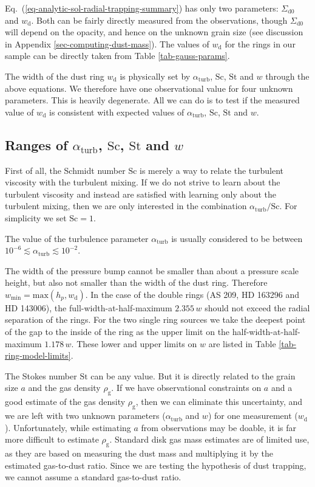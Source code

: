 \documentclass{aa}
\begin{document}
Eq.~(\ref{eq-analytic-sol-radial-trapping-summary}) has only two parameters:
$\Sigma_{\mathrm{d0}}$ and $w_{\mathrm{d}}$. Both can be fairly directly
measured from the observations, though $\Sigma_{\mathrm{d0}}$ will depend on the
opacity, and hence on the unknown grain size (see discussion in Appendix
\ref{sec-computing-dust-mass}). The values of $w_{\mathrm{d}}$ for
the rings in our sample can be directly taken from Table \ref{tab-gauss-params}.

The width of the dust ring $w_{\mathrm{d}}$ is physically set by
$\alpha_{\mathrm{turb}}$, $\mathrm{Sc}$, $\mathrm{St}$ and $w$ through the above
equations. We therefore
have one observational value for four unknown parameters. This is heavily
degenerate. All we can do is to test if the measured value of
$w_{\mathrm{d}}$ is consistent with expected values of $\alpha_{\mathrm{turb}}$,
$\mathrm{Sc}$, $\mathrm{St}$ and $w$.

\subsection{Ranges of $\alpha_{\mathrm{turb}}$, $\mathrm{Sc}$, $\mathrm{St}$ and $w$}
\label{sec-ranges-of-params}
%
First of all, the Schmidt number $\mathrm{Sc}$ is merely a way to relate the
turbulent viscosity with the turbulent mixing. If we do not strive to learn
about the turbulent viscosity and instead are satisfied with learning only about
the turbulent mixing, then we are only interested in the combination
$\alpha_{\mathrm{turb}}/\mathrm{Sc}$. For simplicity we set $\mathrm{Sc}=1$.

The value of the turbulence parameter $\alpha_{\mathrm{turb}}$ is usually
considered to be between $10^{-6}\lesssim \alpha_{\mathrm{turb}}\lesssim
10^{-2}$.

The width of the pressure bump cannot be smaller than about a pressure
scale height, but also not smaller than the width of the dust ring.
Therefore $w_{\mathrm{min}}=\mathrm{max}(h_p,w_{\mathrm{d}})$.
In the case of the double rings (AS 209, HD 163296 and HD 143006),
the full-width-at-half-maximum $2.355\,w$ should not exceed the radial
separation of the rings. For the two single ring sources we take the deepest
point of the gap to the inside of the ring as the upper limit on the
half-width-at-half-maximum $1.178\,w$. These lower and upper limits on $w$
are listed in Table \ref{tab-ring-model-limits}.

The Stokes number $\mathrm{St}$ can be any value. But it is
directly related to the grain size $a$ and the gas density
$\rho_{\mathrm{g}}$. If we have observational constraints on $a$ and a good
estimate of the gas density $\rho_{\mathrm{g}}$, then we can eliminate this
uncertainty, and we are left with two unknown parameters
($\alpha_{\mathrm{turb}}$ and $w$) for one measurement ($w_{\mathrm{d}}$).
Unfortunately, while estimating $a$ from observations may be doable, it is far
more difficult to estimate $\rho_{\mathrm{g}}$. Standard disk gas mass estimates
are of limited use, as they are based on measuring the dust mass and multiplying
it by the estimated gas-to-dust ratio. Since we are testing the hypothesis of
dust trapping, we cannot assume a standard gas-to-dust ratio.
\end{document}
